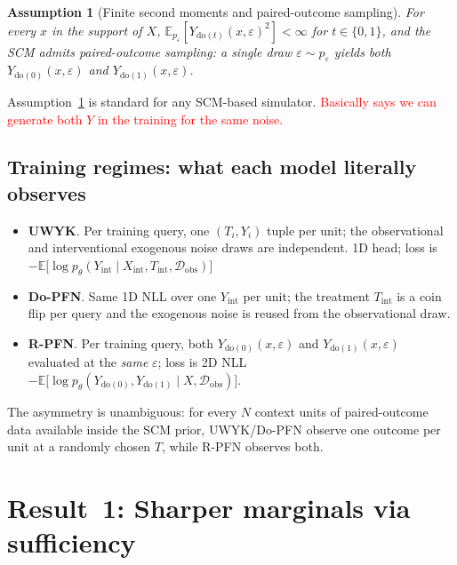 \documentclass[11pt]{article}
\newtheorem{assumption}{Assumption}
\theoremstyle{remark}
\newcommand{\EE}{\mathbb{E}}
\begin{document}
\begin{assumption}[Finite second moments and paired-outcome sampling]
\label{ass:regularity}
For every $x$ in the support of $X$,
$\EE_{p_\varepsilon}[Y_{\mathrm{do}(t)}(x,\varepsilon)^2] < \infty$
for $t \in \{0, 1\}$, and the SCM admits paired-outcome sampling:
a single draw $\varepsilon \sim p_\varepsilon$ yields both
$Y_{\mathrm{do}(0)}(x, \varepsilon)$ and $Y_{\mathrm{do}(1)}(x, \varepsilon)$.
\end{assumption}

Assumption~\ref{ass:regularity} is standard for any SCM-based simulator. \textcolor{red}{Basically says we can generate both $Y$ in the training for the same noise.}

\subsection{Training regimes: what each model literally observes}
\label{subsec:training-regimes}

\begin{itemize}
  \item \textbf{UWYK}. Per
    training query, one $(T_i, Y_i)$ tuple per unit; the observational
    and interventional exogenous noise draws are independent. 1D head; loss is
    $-\EE\bigl[\log p_\theta(Y_{\mathrm{int}} \mid X_{\mathrm{int}},
      T_{\mathrm{int}}, \mathcal{D}_{\mathrm{obs}})\bigr]$
  \item \textbf{Do-PFN}. Same 1D NLL over one $Y_{\mathrm{int}}$ per unit; the treatment $T_{\mathrm{int}}$
    is a coin flip per query and the exogenous noise is reused from the observational draw.
  \item \textbf{R-PFN}. Per training query, both
    $Y_{\mathrm{do}(0)}(x, \varepsilon)$ and $Y_{\mathrm{do}(1)}(x, \varepsilon)$
    evaluated at the \emph{same} $\varepsilon$; loss is 2D NLL
    $-\EE\bigl[\log p_\theta(Y_{\mathrm{do}(0)}, Y_{\mathrm{do}(1)}
      \mid X, \mathcal{D}_{\mathrm{obs}})\bigr]$.
\end{itemize}

The asymmetry is unambiguous: for every $N$ context units of
paired-outcome data available inside the SCM prior, UWYK/Do-PFN
observe one outcome per unit at a randomly chosen $T$, while R-PFN
observes both.

\section{Result~1: Sharper marginals via sufficiency}
\label{sec:marginal-improvement}
\end{document}
